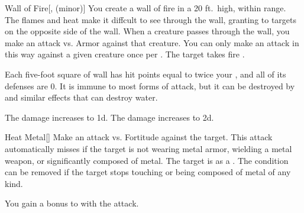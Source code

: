\lowercase{\hypertarget{spell:Wall of Fire}{}}\label{spell:Wall of Fire}
\begin{freeability}[Rank 4]{\hypertarget{spell:Wall of Fire}{Wall of Fire}}[,  (minor)]
You create a wall of fire in a 20 ft.\ high, \arealarge {} within \rngmed range.
The flames and heat make it diffcult to see through the wall, granting  to targets on the opposite side of the wall.
When a creature passes through the wall, you make an attack vs. Armor against that creature.
You can only make an attack in this way against a given creature once per .
\hit The target takes fire .

Each five-foot square of wall has hit points equal to twice your , and all of its defenses are 0.
It is immune to most forms of attack, but it can be destroyed by  and similar effects that can destroy water.

\rankline
{} The damage increases to  \plus1d.
 The damage increases to  \plus2d.
\end{freeability}
\vspace{0.25em}



\lowercase{\hypertarget{spell:Heat Metal}{}}\label{spell:Heat Metal}
\begin{freeability}[Rank 5]{\hypertarget{spell:Heat Metal}{Heat Metal}}[]
Make an attack vs. Fortitude against the target.
This attack automatically misses if the target is not wearing metal armor, wielding a metal weapon, or significantly composed of metal.
\hit The target is  as a .
The condition can be removed if the target stops touching or being composed of metal of any kind.

\rankline
{} You gain a  bonus to  with the attack.
\end{freeability}
\vspace{0.25em}


